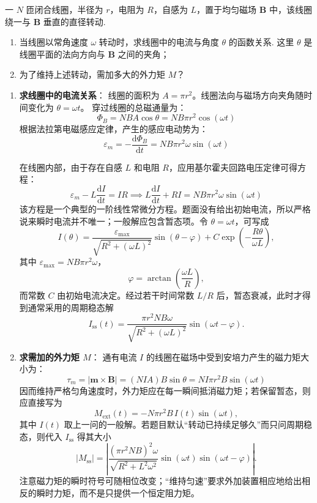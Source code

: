 \begin{exercise}\label{ex:18.3}
一 $N$ 匝闭合线圈，半径为 $r$，电阻为 $R$，自感为 $L$，置于均匀磁场 $\boldsymbol{B}$ 中，该线圈绕一与 $\boldsymbol{B}$ 垂直的直径转动. 
\begin{enumerate}
  \item[(a)] 当线圈以常角速度 $\omega$ 转动时，求线圈中的电流与角度 $\theta$ 的函数关系. 这里 $\theta$ 是线圈平面的法向方向与 $\boldsymbol{B}$ 之间的夹角；
  \item[(b)] 为了维持上述转动，需加多大的外力矩 $M$？
\end{enumerate}
\end{exercise}
\begin{solution}
\begin{enumerate}
    \item[(a)] \textbf{求线圈中的电流关系}：
    线圈的面积为 $A = \pi r^2$。线圈法向与磁场方向夹角随时间变化为 $\theta = \omega t$。
    穿过线圈的总磁通量为：
    $$ \Phi_B = N B A \cos\theta = N B \pi r^2 \cos(\omega t) $$
    根据法拉第电磁感应定律，产生的感应电动势为：
    $$ \varepsilon_m = -\frac{\mathrm{d}\Phi_B}{\mathrm{d}t} = N B \pi r^2 \omega \sin(\omega t) $$
    
    在线圈内部，由于存在自感 $L$ 和电阻 $R$，应用基尔霍夫回路电压定律可得方程：
    $$ \varepsilon_m - L \frac{\mathrm{d}I}{\mathrm{d}t} = I R \implies L \frac{\mathrm{d}I}{\mathrm{d}t} + R I = N B \pi r^2 \omega \sin(\omega t) $$
    该方程是一个典型的一阶线性常微分方程。题面没有给出初始电流，所以严格说来瞬时电流并不唯一；一般解应包含暂态项。令 $\theta=\omega t$，可写成
    \[
    I(\theta)=\frac{\varepsilon_{\max}}{\sqrt{R^2+(\omega L)^2}}\sin(\theta-\varphi)
      +C\exp\!\left(-\frac{R\theta}{\omega L}\right),
    \]
    其中 $\varepsilon_{\max}=NB\pi r^2\omega$，
    $$ \varphi = \arctan\left( \frac{\omega L}{R} \right), $$
    而常数 $C$ 由初始电流决定。经过若干时间常数 $L/R$ 后，暂态衰减，此时才得到通常采用的周期稳态解
    $$ I_{\mathrm{ss}}(t) = \frac{\pi r^2 N B \omega}{\sqrt{R^2 + (\omega L)^2}} \sin(\omega t - \varphi). $$

    \item[(b)] \textbf{求需加的外力矩 $M$}：
    通有电流 $I$ 的线圈在磁场中受到安培力产生的磁力矩大小为：
    $$ \tau_m = |\boldsymbol{m} \times \boldsymbol{B}| = (N I A) B \sin\theta = N I \pi r^2 B \sin(\omega t) $$
    因而维持严格匀角速度时，外力矩应在每一瞬间抵消磁力矩；若保留暂态，则应直接写为
    $$ M_{\mathrm{ext}}(t)=-N\pi r^2B\,I(t)\sin(\omega t), $$
    其中 $I(t)$ 取上一问的一般解。若题目默认“转动已持续足够久”而只问周期稳态，则代入 $I_{\mathrm{ss}}$ 得其大小
    $$ |M_{\mathrm{ss}}|
    =\left|\frac{(\pi r^2 N B)^2 \omega}{\sqrt{R^2 + L^2 \omega^2}}
      \sin(\omega t) \sin(\omega t - \varphi)\right|. $$
    注意磁力矩的瞬时符号可随相位改变；“维持匀速”要求外加装置相应地给出相反的瞬时力矩，而不是只提供一个恒定阻力矩。
\end{enumerate}
\end{solution}


